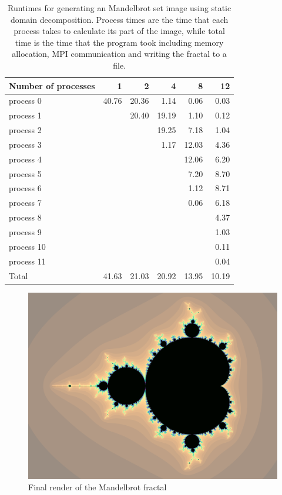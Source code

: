 \documentclass[a4paper]{article}
\begin{document}
\begin{table}[h]
	\centering
	\caption{Runtimes for generating an Mandelbrot set image using static domain decomposition. Process times are the time that each process takes to calculate its part of the image, while total time is the time that the program took including memory allocation, MPI communication and writing the fractal to a file.}
	\label{tbl:mandelbrot}
	\begin{tabular}{l|r|r|r|r|r}
		Number of processes & 1 & 2 & 4 & 8 & 12 \\ \hline
		process 0  & 40.76 & 20.36 &  1.14 &  0.06 &  0.03 \\
		process 1  &       & 20.40 & 19.19 &  1.10 &  0.12 \\
		process 2  &       &       & 19.25 &  7.18 &  1.04 \\
		process 3  &       &       &  1.17 & 12.03 &  4.36 \\
		process 4  &       &       &       & 12.06 &  6.20 \\
		process 5  &       &       &       &  7.20 &  8.70 \\
		process 6  &       &       &       &  1.12 &  8.71 \\
		process 7  &       &       &       &  0.06 &  6.18 \\
		process 8  &       &       &       &       &  4.37 \\
		process 9  &       &       &       &       &  1.03 \\
		process 10 &       &       &       &       &  0.11 \\
		process 11 &       &       &       &       &  0.04 \\ \hline
		Total      & 41.63 & 21.03 & 20.92 & 13.95 & 10.19
	\end{tabular}
\end{table}

\begin{figure}
	\centering
	\includegraphics[width=.75\textwidth]{mandelbrot/mandelbrot.png}
	\caption{Final render of the Mandelbrot fractal}
	\label{fig:mandelbrot}
\end{figure}
\end{document}
